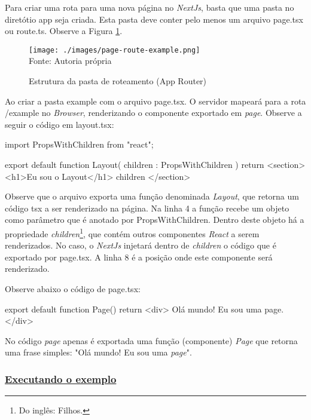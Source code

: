 Para criar uma rota para uma nova página no \textit{NextJs}, basta que
uma pasta no diretótio app seja criada. Esta pasta deve conter
pelo menos um arquivo page.tsx ou route.ts. Observe a
Figura \ref{fig:page-route-example}.

\begin{figure}[H]
    \centering
    \caption{Estrutura da pasta de roteamento (App Router)}
    \texttt{[image: ./images/page-route-example.png]}
    \label{fig:page-route-example} \\
    \textnormal{\fontsize{10pt}{12pt}Fonte: Autoria própria}
\end{figure}

Ao criar a pasta example com o arquivo page.tsx. O servidor
mapeará para a rota /example no \textit{Browser}, renderizando o componente
exportado em \textit{page}. Observe a seguir o código em layout.tsx:

\begin{layoutExample}
import { PropsWithChildren } from "react";

export default function Layout(
    { children }: PropsWithChildren
){
    return <section>
        <h1>Eu sou o Layout</h1>
        { children }
    </section>
}
\end{layoutExample}

Observe que o arquivo exporta uma função
denominada \textit{Layout}, que retorna um código
\acrshort{tsx}
a ser renderizado na página.
Na linha 4 a função recebe um objeto
como parâmetro que é anotado por PropsWithChildren.
Dentro deste objeto há a propriedade
\textit{children}\footnote{Do inglês: Filhos.
},
que
contém outros componentes \textit{React} a serem renderizados.
No caso, o \textit{NextJs} injetará dentro de \textit{children} o código que
é exportado por page.tsx.
A linha 8 é a posição onde este componente será renderizado.

Observe abaixo o código de page.tsx:

\begin{pageExample}
export default function Page(){
    return <div>
        Olá mundo!
        Eu sou uma page.
    </div>
}
\end{pageExample}

No código \textit{page} apenas é exportada uma função (componente)
\textit{Page} que retorna uma frase simples: "Olá mundo! Eu sou uma \textit{page}".

\subsubsection{\underline{Executando o exemplo}}

